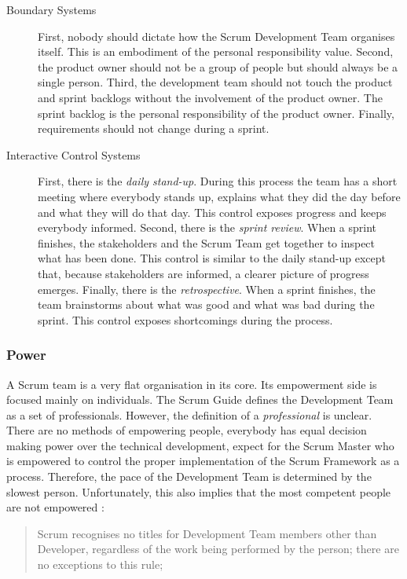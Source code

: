 \begin{description}
\item[Boundary Systems]
First, nobody should dictate how the Scrum Development Team organises itself.
This is an embodiment of the personal responsibility value.
Second, the product owner should not be a group of people but should always be a single person.
Third, the development team should not touch the product and sprint backlogs without the involvement of the product owner.
The sprint backlog is the personal responsibility of the product owner.
Finally, requirements should not change during a sprint.

\item[Interactive Control Systems]
First, there is the \emph{daily stand-up}.
During this process the team has a short meeting where everybody stands up, explains what they did the day before and what they will do that day.
This control exposes progress and keeps everybody informed.
Second, there is the \emph{sprint review}.
When a sprint finishes, the stakeholders and the Scrum Team get together to inspect what has been done.
This control is similar to the daily stand-up except that, because stakeholders are informed, a clearer picture of progress emerges.
Finally, there is the \emph{retrospective}.
When a sprint finishes, the team brainstorms about what was good and what was bad during the sprint.
This control exposes shortcomings during the process.

\end{description}

\subsubsection{Power}
A Scrum team is a very flat organisation in its core. Its empowerment side is focused mainly on individuals. The Scrum Guide \citep{schwaber2011scrum} defines the Development Team as a set of professionals. However, the definition of a \textit{professional} is unclear. 
There are no methods of empowering people, everybody has equal decision making power over the technical development, expect for the Scrum Master who is empowered to control the proper implementation of the Scrum Framework as a process.
Therefore, the pace of the Development Team is determined by the slowest person.
Unfortunately, this also implies that the most competent people are not empowered \citep[page 6]{schwaber2011scrum}:

\begin{quote}
Scrum recognises no titles for Development Team members other than Developer, regardless of the work being performed by the person; there are no exceptions to this rule;
\end{quote}

